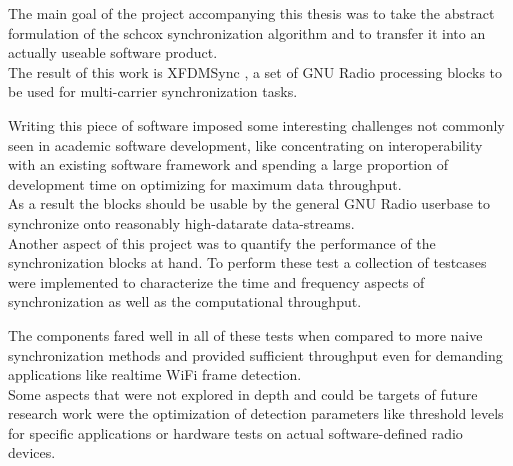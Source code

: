 The main goal of the project accompanying this thesis was
to take the abstract formulation of the \acrlong{schcox}
synchronization algorithm and to transfer it into an actually
useable software product. \\

The result of this work is XFDMSync \cite{xfdmsyncweb},
a set of GNU Radio processing blocks to be used for multi-carrier
synchronization tasks.

Writing this piece of software imposed some interesting
challenges not commonly seen in academic software development,
like concentrating on interoperability with an existing
software framework and spending a large proportion of
development time on optimizing for maximum data throughput. \\

As a result the blocks should be usable
by the general GNU Radio userbase to synchronize onto
reasonably high-datarate data-streams. \\

Another aspect of this project was to quantify
the performance of the synchronization blocks at hand.
To perform these test a collection of testcases
were implemented to characterize the
time and frequency aspects of synchronization as
well as the computational throughput.

The components fared well in all of these tests
when compared to more naive synchronization
methods and provided sufficient throughput
even for demanding applications like realtime WiFi frame
detection. \\

Some aspects that were not explored in depth
and could be targets of future research work
were the optimization of detection parameters
like threshold levels for specific applications
or hardware tests on actual software-defined radio
devices.
